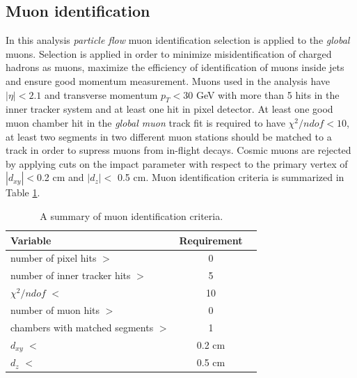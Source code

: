 
\subsection{Muon identification}
\label{sec:muID}

In this analysis \textit{particle flow} muon identification selection is applied to the \textit{global} muons. Selection is applied in order to minimize misidentification of charged hadrons as muons, maximize the efficiency of identification of muons inside jets and ensure good momentum measurement. Muons used in the analysis have $|\eta|<2.1$ and transverse momentum $p_T<30$ GeV with more than 5 hits in the inner tracker system and at least one hit in pixel detector. At least one good muon chamber hit in the \textit{global muon} track fit is required to have $\chi^2/ndof<10$, at least two segments in two different muon stations should be matched to a track in order to supress muons from in-flight decays. Cosmic muons are rejected by applying cuts on the impact parameter with respect to the primary vertex of $|d_{xy}|<$0.2 cm and $|d_z|<$ 0.5 cm. Muon identification criteria is summarized in Table \ref{tab:muID}.

  \begin{table}[h]
\centering
  \caption{A summary of muon identification criteria.}
  \label{tab:muID}
  \begin{tabular}{ l  c c}
      \hline
      \hline
      	Variable & Requirement \\
      	\hline
    		number of pixel hits $>$ &  0 \\
     	number of inner tracker hits $>$ &  5 \\
     	$\chi^2/ndof$ $<$ & 10 \\
		number of muon hits $>$ & 0  \\
		chambers with matched segments $>$ & 1  \\		
		$d_{xy}$ $<$ & 0.2 cm \\
		$d_{z}$ $<$  & 0.5 cm \\
      \hline
      \hline 
  \end{tabular}
\end{table}
 


